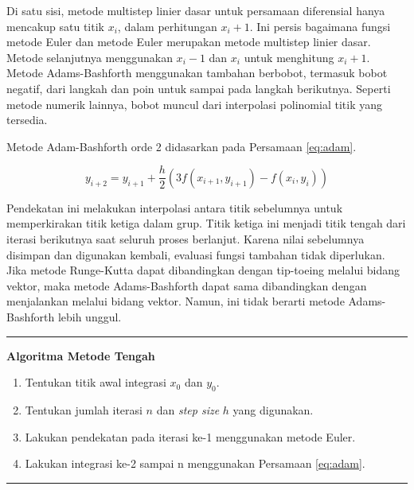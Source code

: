 \documentclass[]{book}
\providecommand{\tightlist}{%
  \setlength{\itemsep}{0pt}\setlength{\parskip}{0pt}}
\theoremstyle{definition}
\theoremstyle{definition}
\theoremstyle{definition}
\theoremstyle{remark}
\begin{document}
Di satu sisi, metode multistep linier dasar untuk persamaan diferensial hanya mencakup satu titik \(x_i\), dalam perhitungan \(x_i + 1\). Ini persis bagaimana fungsi metode Euler dan metode Euler merupakan metode multistep linier dasar. Metode selanjutnya menggunakan \(x_i − 1\) dan \(x_i\) untuk menghitung \(x_i + 1\). Metode Adams-Bashforth menggunakan tambahan berbobot, termasuk bobot negatif, dari langkah dan poin untuk sampai pada langkah berikutnya. Seperti metode numerik lainnya, bobot muncul dari interpolasi polinomial titik yang tersedia.

Metode Adam-Bashforth orde 2 didasarkan pada Persamaan \eqref{eq:adam}.

\begin{equation}
y_{i+2}=y_{i+1}+\frac{h}{2}\left(3f\left(x_{i+1},y_{i+1}\right)-f\left(x_i,y_i\right)\right)
  \label{eq:adam}
\end{equation}

Pendekatan ini melakukan interpolasi antara titik sebelumnya untuk memperkirakan titik ketiga dalam grup. Titik ketiga ini menjadi titik tengah dari iterasi berikutnya saat seluruh proses berlanjut. Karena nilai sebelumnya disimpan dan digunakan kembali, evaluasi fungsi tambahan tidak diperlukan. Jika metode Runge-Kutta dapat dibandingkan dengan tip-toeing melalui bidang vektor, maka metode Adams-Bashforth dapat sama dibandingkan dengan menjalankan melalui bidang vektor. Namun, ini tidak berarti metode Adams-Bashforth lebih unggul.

\begin{center}\rule{0.5\linewidth}{\linethickness}\end{center}

\textbf{Algoritma Metode Tengah}

\begin{enumerate}
\def\labelenumi{\arabic{enumi}.}
\tightlist
\item
  Tentukan titik awal integrasi \(x_0\) dan \(y_0\).
\item
  Tentukan jumlah iterasi \(n\) dan \emph{step size} \(h\) yang digunakan.
\item
  Lakukan pendekatan pada iterasi ke-1 menggunakan metode Euler.
\item
  Lakukan integrasi ke-2 sampai n menggunakan Persamaan \eqref{eq:adam}.
\end{enumerate}

\begin{center}\rule{0.5\linewidth}{\linethickness}\end{center}
\end{document}
